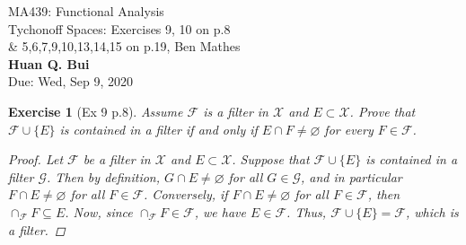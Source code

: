 \documentclass[11pt]{article}
\newtheorem{exercise}{Exercise}
\begin{document}
\begin{center}
\begin{framed}
{\Large  MA439: Functional Analysis\\
	 Tychonoff Spaces:  Exercises 9, 10 on p.8 \\
	 \&   5,6,7,9,10,13,14,15 on p.19, Ben Mathes}\\
$\,$\\
{\Large \bf  Huan Q. Bui\\}
$\,$\\
{\Large Due: Wed, Sep 9, 2020}
\end{framed}
\end{center}

\begin{exercise}[Ex 9 p.8]
	Assume $\mathcal{F}$ is a filter in $\mathcal{X}$ and $E \subset \mathcal{X}$. Prove that $\mathcal{F} \cup \{E\}$ is contained in a filter if and only if $E \cap F \neq \varnothing$ for every $F \in \mathcal{F}$. 
	\begin{proof}
		Let $\mathcal{F}$ be a filter in $\mathcal{X}$ and $E \subset \mathcal{X}$. Suppose that $\mathcal{F}\cup \{ E \}$ is contained in a filter $\mathcal{G}$. Then by definition, $G\cap E \neq \varnothing$ for all $G\in \mathcal{G}$, and in particular $F\cap E \neq \varnothing$ for all $F\in \mathcal{F}$. Conversely, if $F \cap E \neq \varnothing$ for all $F \in \mathcal{F}$, then $\cap_\mathcal{F} F \subseteq E$. Now, since $\cap_\mathcal{F} F \in \mathcal{F}$, we have $E \in \mathcal{F}$. Thus, $\mathcal{F} \cup \{ E \} = \mathcal{F}$, which is a filter. 
	\end{proof}
\end{exercise}
\end{document}
